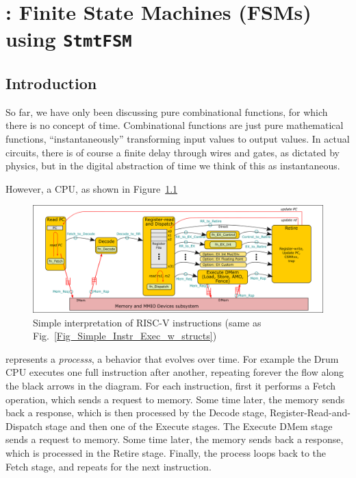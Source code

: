 

\chapter{{\BSV}: Finite State Machines (FSMs) using {\tt StmtFSM}}


\setcounter{page}{1}
\renewcommand{\thepage}{\arabic{chapter}-\arabic{page}}

\label{ch_FSMs}


\section{Introduction}


So far, we have only been discussing pure combinational functions, for
which there is no concept of time.  Combinational functions are just
pure mathematical functions, ``instantaneously'' transforming input
values to output values.  In actual circuits, there is of course a
finite delay through wires and gates, as dictated by physics, but in
the digital abstraction of time we think of this as instantaneous.

However, a CPU, as shown in Figure~\ref{Fig_FSMs_Simple_Instr_Exec}
\begin{figure}[htbp]
  \centerline{\includegraphics[width=6in,angle=0]{Figures/Fig_Instr_Exec_w_structs}}
  \caption{\label{Fig_FSMs_Simple_Instr_Exec}
           Simple interpretation of RISC-V instructions
	   (same as Fig.~\ref{Fig_Simple_Instr_Exec_w_structs})}
\end{figure}
represents a \emph{processs}, a behavior that evolves over time.  For
example the Drum CPU executes one full instruction after another,
repeating forever the flow along the black arrows in the diagram. For
each instruction, first it performs a Fetch operation, which sends a
request to memory. Some time later, the memory sends back a response,
which is then processed by the Decode stage,
Register-Read-and-Dispatch stage and then one of the Execute stages.
The Execute DMem stage sends a request to memory. Some time later, the
memory sends back a response, which is processed in the Retire stage.
Finally, the process loops back to the Fetch stage, and repeats for
the next instruction.

